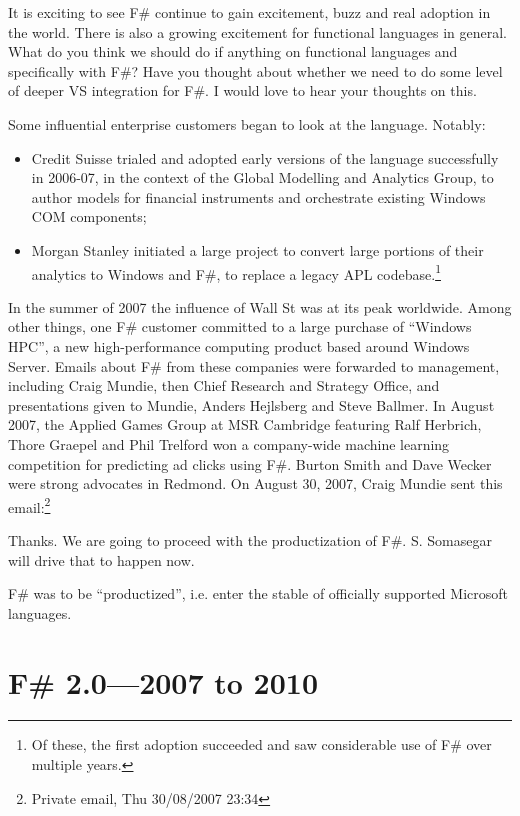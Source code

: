 \documentclass[acmsmall]{acmart}\settopmatter{}
\begin{document}
\begin{verbquote}
It is exciting to see F# continue to gain excitement, buzz and real adoption in the world. There is also a growing
excitement for functional languages in general. What do you think we should do if anything on functional languages
and specifically with F#?  Have you thought about whether we need to do some level of deeper VS integration for F#.  I would love to hear your thoughts on this.
\end{verbquote}
Some influential enterprise customers began to look at the language.  Notably:

\begin{itemize}
\item Credit Suisse trialed and adopted early versions of the language successfully in 2006-07, in the context
of the Global Modelling and Analytics Group, to author models for financial instruments and orchestrate existing Windows COM components;
\item Morgan Stanley initiated a large project to convert large portions of their analytics to Windows and F\#, to
replace a legacy APL codebase.\footnote{Of these, the first adoption succeeded and saw considerable use of F\# over multiple years.}
\end{itemize}

In the summer of 2007 the influence of Wall St was at its peak worldwide. Among other things, one F\# customer
committed to a large purchase of “Windows HPC”, a new high-performance computing product based around
Windows Server. Emails about F\# from these companies were forwarded to management, including Craig Mundie,
then Chief Research and Strategy Office, and presentations given to Mundie, Anders Hejlsberg and Steve Ballmer.
In August 2007, the Applied Games Group at MSR Cambridge featuring Ralf Herbrich, Thore Graepel and Phil
Trelford won a company-wide machine learning competition for predicting ad clicks using F\#.  Burton Smith and
Dave Wecker were strong advocates in Redmond. On August 30, 2007, Craig Mundie sent this email:\footnote{Private email, Thu 30/08/2007 23:34}
\begin{verbquote}
Thanks.  We are going to proceed with the productization of F#.  S. Somasegar will drive that to happen now.
\end{verbquote}
F\# was to be “productized”, i.e. enter the stable of officially supported Microsoft languages.

\section*{F\# 2.0---2007 to 2010}
\end{document}
